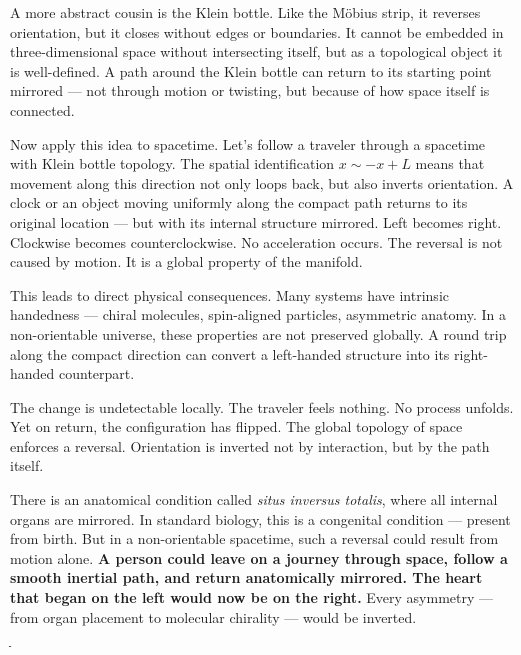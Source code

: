 A more abstract cousin is the Klein bottle. Like the Möbius strip, it reverses orientation, but it closes without edges or boundaries. It cannot be embedded in three-dimensional space without intersecting itself, but as a topological object it is well-defined. A path around the Klein bottle can return to its starting point mirrored — not through motion or twisting, but because of how space itself is connected.

Now apply this idea to spacetime. Let’s follow a traveler through a spacetime with Klein bottle topology. The spatial identification $x \sim -x + L$ means that movement along this direction not only loops back, but also inverts orientation. A clock or an object moving uniformly along the compact path returns to its original location — but with its internal structure mirrored. Left becomes right. Clockwise becomes counterclockwise. No acceleration occurs. The reversal is not caused by motion. It is a global property of the manifold.

This leads to direct physical consequences. Many systems have intrinsic handedness — chiral molecules, spin-aligned particles, asymmetric anatomy. In a non-orientable universe, these properties are not preserved globally. A round trip along the compact direction can convert a left-handed structure into its right-handed counterpart.

The change is undetectable locally. The traveler feels nothing. No process unfolds. Yet on return, the configuration has flipped. The global topology of space enforces a reversal. Orientation is inverted not by interaction, but by the path itself.

There is an anatomical condition called \textit{situs inversus totalis}, where all internal organs are mirrored. In standard biology, this is a congenital condition — present from birth. But in a non-orientable spacetime, such a reversal could result from motion alone. \textbf{A person could leave on a journey through space, follow a smooth inertial path, and return anatomically mirrored. The heart that began on the left would now be on the right.} Every asymmetry — from organ placement to molecular chirality — would be inverted.

ֿ\clearpage

